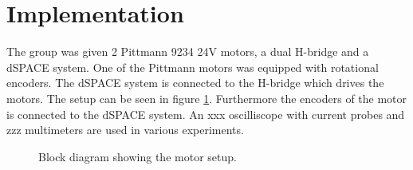 \section{Implementation}
The group was given 2 Pittmann 9234 24V motors, a dual H-bridge and a dSPACE system. 
One of the Pittmann motors was equipped with rotational encoders.
The dSPACE system is connected to the H-bridge which drives the motors. 
The setup can be seen in figure \ref{fig:implementation_block}.
Furthermore the encoders of the motor is connected to the dSPACE system.
An xxx oscilliscope with current probes and zzz multimeters are used in various experiments.

\begin{figure}[!h]
\centering

  \caption{Block diagram showing the motor setup.}
  \label{fig:implementation_block}
\end{figure}

